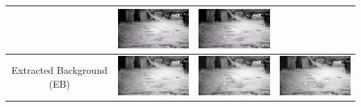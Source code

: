 \documentclass[11pt]{scrartcl} %
\theoremstyle{plain}
\begin{document}
\begin{minipage}{\linewidth}
\begin{tabular}{ | c | m{2.8cm} | m{2.8cm} | m{2.8cm} | }
\begin{minipage}{.3\textwidth}
    \end{minipage}
	&
    \begin{minipage}{.3\textwidth}
      \includegraphics[width=\linewidth, width=25mm]{figures_video/crow/background.png}
    \end{minipage}
    &
    \begin{minipage}{.3\textwidth}
      \includegraphics[width=\linewidth, width=25mm]{figures_video/crow/background.png}
    \end{minipage}
	\\[5ex] \hline
	
	Extracted Background (EB)
	&
    \begin{minipage}{.3\textwidth}
      \includegraphics[width=\linewidth, width=25mm]{figures_video/crow/rpca/lowRank_0_015.png}
    \end{minipage}	
	&
    \begin{minipage}{.3\textwidth}
      \includegraphics[width=\linewidth, width=25mm]{figures_video/crow/pca/lowRank_0.png}
    \end{minipage}
	&
    \begin{minipage}{.3\textwidth}
      \includegraphics[width=\linewidth, width=25mm]{figures_video/crow/pca2/lowRank_0.png}
    \end{minipage}
	\\[6ex] \hline
	

\end{tabular}
\end{minipage}
\end{document}

